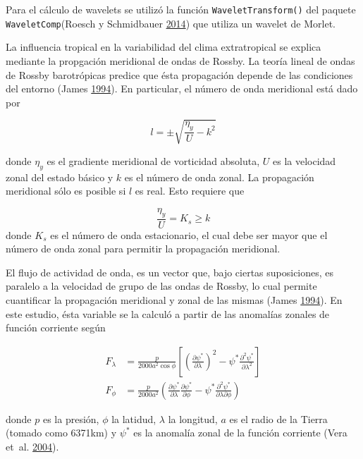 \documentclass[spanish,a4paper,12p]{book}
\begin{document}
Para el cálculo de wavelets se utilizó la función
\texttt{WaveletTransform()} del paquete \texttt{WaveletComp}(Roesch y
Schmidbauer \protect\hyperlink{ref-R-WaveletComp}{2014}) que utiliza un
wavelet de Morlet.

La influencia tropical en la variabilidad del clima extratropical se
explica mediante la propgación meridional de ondas de Rossby. La teoría
lineal de ondas de Rossby barotrópicas predice que ésta propagación
depende de las condiciones del entorno (James
\protect\hyperlink{ref-James}{1994}). En particular, el número de onda
meridional está dado por

\[
l = \pm \sqrt{\frac{\eta_{y}}{U} - k^2}
\]

donde \(\eta_{y}\) es el gradiente meridional de vorticidad absoluta,
\(U\) es la velocidad zonal del estado básico y \(k\) es el número de
onda zonal. La propagación meridional sólo es posible si \(l\) es real.
Esto requiere que

\[
\frac{\eta_{y}}{U} = K_s \ge k 
\] donde \(K_s\) es el número de onda estacionario, el cual debe ser
mayor que el número de onda zonal para permitir la propagación
meridional.

El flujo de actividad de onda, es un vector que, bajo ciertas
suposiciones, es paralelo a la velocidad de grupo de las ondas de
Rossby, lo cual permite cuantificar la propagación meridional y zonal de
las mismas (James \protect\hyperlink{ref-James}{1994}). En este estudio,
ésta variable se la calculó a partir de las anomalías zonales de función
corriente según

\[
\begin{aligned}
F_\lambda &= \frac{p}{2000a^2\cos\phi}\left[ \left( \frac{\partial \psi^*}{\partial \lambda} \right)^2 - \psi^*\frac{\partial^2 \psi^*}{\partial \lambda^2}  \right] \\
F_\phi &= \frac{p}{2000a^2} \left( \frac{\partial \psi^*}{\partial \lambda}\frac{\partial \psi^*}{\partial \phi}  - \psi^* \frac{\partial^2 \psi^*}{\partial \lambda \partial \phi} \right) 
\end{aligned}
\]

donde \(p\) es la presión, \(\phi\) la latidud, \(\lambda\) la longitud,
\(a\) es el radio de la Tierra (tomado como 6371km) y \(\psi^*\) es la
anomalía zonal de la función corriente (Vera et~al.
\protect\hyperlink{ref-Vera2004}{2004}).
\end{document}
